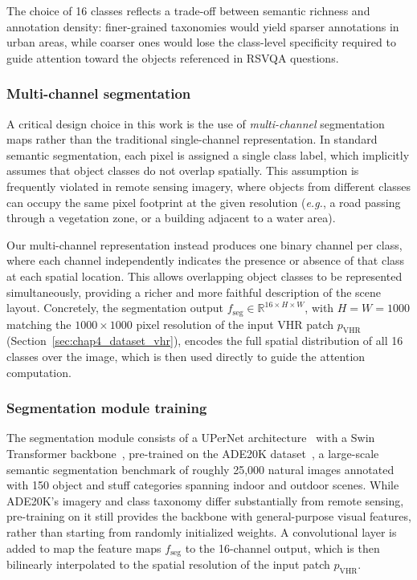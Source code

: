 The choice of 16 classes reflects a trade-off between
semantic richness and annotation density: finer-grained
taxonomies would yield sparser annotations in urban areas,
while coarser ones would lose the class-level specificity
required to guide attention toward the objects referenced
in RSVQA questions.

\subsubsection{Multi-channel segmentation}
\label{sec:chap4_seg_multichannel}

A critical design choice in this work is the use of
\textit{multi-channel} segmentation maps rather than the
traditional single-channel representation. In standard
semantic segmentation, each pixel is assigned a single
class label, which implicitly assumes that object classes
do not overlap spatially. This assumption is frequently
violated in remote sensing imagery, where objects from
different classes can occupy the same pixel footprint at
the given resolution (\textit{e.g.}, a road passing through
a vegetation zone, or a building adjacent to a water area).

Our multi-channel representation instead produces one
binary channel per class, where each channel independently
indicates the presence or absence of that class at each
spatial location. This allows overlapping object classes
to be represented simultaneously, providing a richer and
more faithful description of the scene layout. Concretely,
the segmentation output $f_\text{seg} \in \mathbb{R}^{16
\times H \times W}$, with $H = W = 1000$ matching the
$1000 \times 1000$ pixel resolution of the input VHR patch
$p_\text{VHR}$ (Section~\ref{sec:chap4_dataset_vhr}), encodes the full spatial distribution
of all 16 classes over the image, which is then used
directly to guide the attention computation.

\subsubsection{Segmentation module training}
\label{sec:chap4_seg_training}

The segmentation module consists of a UPerNet
architecture~\cite{xiao2018upernet} with a Swin
Transformer backbone~\cite{liu2021swin}, pre-trained on
the ADE20K dataset~\cite{zhou2019ade20k}, a large-scale
semantic segmentation benchmark of roughly 25,000 natural
images annotated with 150 object and stuff categories
spanning indoor and outdoor scenes. While ADE20K's imagery
and class taxonomy differ substantially from remote sensing,
pre-training on it still provides the backbone with
general-purpose visual features, rather than
starting from randomly initialized weights. A convolutional
layer is added to map the feature maps $f_\text{seg}$ to
the 16-channel output, which is then bilinearly interpolated
to the spatial resolution of the input patch $p_\text{VHR}$.

